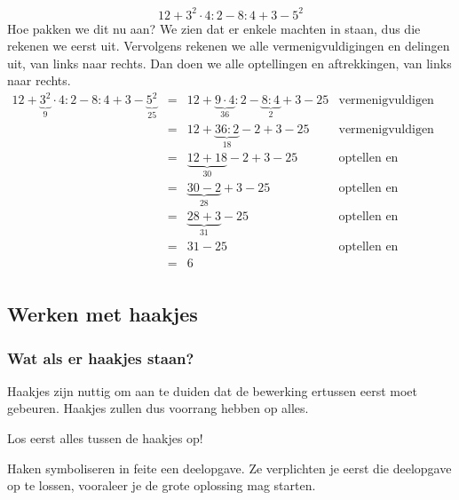 \begin{voorbeeld}
	\begin{equation*}
	12+3^2 \cdot 4 : 2 - 8 : 4 + 3 - 5^2
	\end{equation*}
	Hoe pakken we dit nu aan? We zien dat er enkele machten in staan, dus die rekenen we eerst uit. Vervolgens rekenen we alle vermenigvuldigingen en delingen uit, van links naar rechts. Dan doen we alle optellingen en aftrekkingen, van links naar rechts.
	\begin{equation*}
	\begin{array}{lllr}
	12+\underbrace{3^2}_{9} \cdot 4 : 2 - 8 : 4 + 3 - \underbrace{5^2}_{25} &=& 12+ \underbrace{9 \cdot 4}_{36} : 2 - \underbrace{8 : 4}_{2} + 3 - 25 & \text{vermenigvuldigen en delen} \\
	&=& 12+ \underbrace{36 : 2}_{18} - 2 + 3 - 25 & \text{vermenigvuldigen en delen} \\
	&=& \underbrace{12+18} _{30} - 2 + 3 - 25 & \text{optellen en aftrekken} \\
	&=& \underbrace{30 - 2}_{28} + 3 - 25 & \text{optellen en aftrekken} \\
	&=& \underbrace{28+3}_{31} - 25 & \text{optellen en aftrekken} \\
	&=& 31 - 25 & \text{optellen en aftrekken} \\
	&=& 6 &  \\
	\end{array}
	\end{equation*}
\end{voorbeeld}


\subsection{Werken met haakjes}
\subsubsection{Wat als er haakjes staan?}

Haakjes zijn nuttig om aan te duiden dat de bewerking ertussen eerst moet gebeuren. Haakjes zullen dus voorrang hebben op alles.

\begin{ftonthoud}
Los eerst alles tussen de haakjes op!	
\end{ftonthoud}

Haken symboliseren in feite een deelopgave. Ze verplichten je eerst die deelopgave op te lossen, vooraleer je de grote oplossing mag starten.


